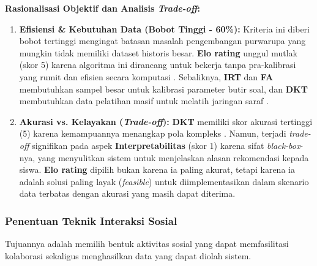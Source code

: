 \textbf{Rasionalisasi Objektif dan Analisis \textit{Trade-off}:}
\begin{enumerate}
    \item \textbf{Efisiensi \& Kebutuhan Data (Bobot Tinggi - 60\%):} Kriteria ini diberi bobot tertinggi mengingat batasan masalah pengembangan purwarupa yang mungkin tidak memiliki dataset historis besar. \textbf{Elo rating} unggul mutlak (skor 5) karena algoritma ini dirancang untuk bekerja tanpa pra-kalibrasi yang rumit dan efisien secara komputasi \autocite{Vesin2022}. Sebaliknya, \textbf{IRT} dan \textbf{FA} membutuhkan sampel besar untuk kalibrasi parameter butir soal, dan \textbf{DKT} membutuhkan data pelatihan masif untuk melatih jaringan saraf \autocite{Minn2022}.
    
    \item \textbf{Akurasi vs. Kelayakan (\textit{Trade-off}):} \textbf{DKT} memiliki skor akurasi tertinggi (5) karena kemampuannya menangkap pola kompleks \autocite{Minn2022}. Namun, terjadi \textit{trade-off} signifikan pada aspek \textbf{Interpretabilitas} (skor 1) karena sifat \textit{black-box}-nya, yang menyulitkan sistem untuk menjelaskan alasan rekomendasi kepada siswa. \textbf{Elo rating} dipilih bukan karena ia paling akurat, tetapi karena ia adalah solusi paling layak (\textit{feasible}) untuk diimplementasikan dalam skenario data terbatas dengan akurasi yang masih dapat diterima.
\end{enumerate}

\subsubsection{Penentuan Teknik Interaksi Sosial}
\label{sssec:keputusan_asesmen_sosial}
Tujuannya adalah memilih bentuk aktivitas sosial yang dapat memfasilitasi kolaborasi sekaligus menghasilkan data yang dapat diolah sistem.




